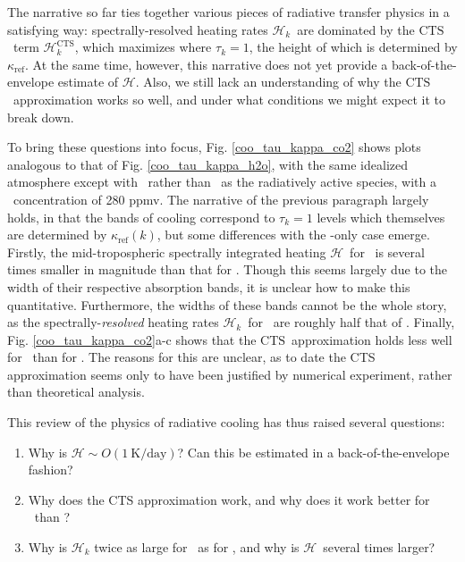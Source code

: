 \documentclass[10pt]{article}
\newcommand{\ch}{\ensuremath{\mathcal{H}}}
\newcommand{\chk}{\ensuremath{\ch_k}}
\newcommand{\chkcts}{\ensuremath{\ch_k^\CTS}}
\newcommand{\tauk}{\ensuremath{\tau_k}}
\newcommand{\CTS}{\ensuremath{\mathrm{CTS}}}
\newcommand{\kapparef}{\ensuremath{\kappa_{\mathrm{ref}}}}
\begin{document}
The narrative so far ties together various pieces of radiative transfer physics in a satisfying way: spectrally-resolved heating rates \chk\ are dominated by the \CTS\ term \chkcts, which maximizes where $\tauk=1$, the height  of which is determined by \kapparef.  At the same time, however, this narrative does not yet provide a back-of-the-envelope estimate of \ch. Also, we still lack an understanding of why the \CTS\ approximation works so well, and under what conditions we might  expect it to break down.

To bring these questions into focus,  Fig. \ref{coo_tau_kappa_co2} shows plots analogous to that of Fig. \ref{coo_tau_kappa_h2o}, with the same idealized atmosphere except with \cotwo\ rather than \htwo\ as the radiatively active species, with a \cotwo\ concentration of 280 ppmv. The narrative of the previous paragraph largely holds, in that the bands of cooling correspond to $\tauk=1$ levels which themselves are determined by $\kapparef(k)$,  but some differences with the \htwo-only case emerge. Firstly, the mid-tropospheric spectrally integrated heating \ch\ for \cotwo\ is several  times smaller in magnitude than that for \htwo. Though this seems largely due to the width of their respective absorption bands, it is unclear how to make this  quantitative. Furthermore, the widths of these bands cannot be the whole story, as the spectrally-\emph{resolved} heating rates \chk\ for \cotwo\ are roughly half that of \htwo.  Finally, Fig. \ref{coo_tau_kappa_co2}a-c shows that the \CTS\ approximation holds less well for \cotwo\ than for \htwo. The reasons for this are unclear, as to date the CTS approximation seems only to have been justified by numerical experiment, rather than theoretical analysis. 

This review of the physics of radiative cooling has thus raised several questions:
\begin{enumerate}
	\item Why is $\ch\sim O(1\ \text{K/day})$? Can this be estimated in a back-of-the-envelope fashion? \label{Q_heating}
	\item Why does the CTS approximation work, and why does it work better for \htwo\ than \cotwo?	    \label{Q_cts}
	\item Why is $\ch_k$ twice as large for \htwo\ as for \cotwo, and why is \ch\ several times larger?		\label{Q_contrast}
\end{enumerate}
\end{document}
